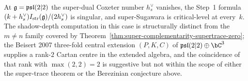 \begin{remark}
\label{rem:psl-2-2-shadow-depth}
At $\mathfrak{g}=\mathfrak{psl}(2|2)$ the super-dual Coxeter number $h^{\vee}_{s}$
vanishes, the Step~1 formula
$(k+h^{\vee}_{s})I_{\operatorname{str}}(\mathfrak{g})/(2 h^{\vee}_{s})$ is singular, and
super-Sugawara is critical-level at every~$k$. The shadow-depth
computation in this case is structurally distinct from the
$m\neq n$ family covered by
Theorem~\ref{thm:super-complementarity-supertrace-zero}; the Beisert
2007 three-fold central extension $(P,K,C)$ of
$\fpsl(2|2)\oplus\bC^{3}$ supplies a rank-$2$ Cartan centre in the
extended algebra, and the coincidence of that rank with $\max(2,2)=2$
is suggestive but not within the scope of either the super-trace
theorem or the Berezinian conjecture above.
\end{remark}

